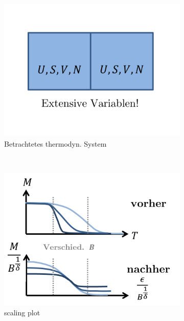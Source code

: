 \documentclass[12pt]{article}
\begin{document}
\begin{figure}[h] 
		\begin{subfigure}[h]{0.5 \textwidth}
		\centering
		\includegraphics[width=\textwidth]{Folie39.png}
		\caption{Betrachtetes thermodyn. System} 
		\label{fig:Erinnerung}
		\centering
	\end{subfigure}
	~
\begin{subfigure}[h]{0.5\textwidth}
		\centering
		\includegraphics[width=\textwidth]{Folie40.png}
		\caption{scaling plot}
		\label{fig:scalingplot}
		\centering
	\end{subfigure}
	\caption{ }
\end{figure}	
\end{document}

